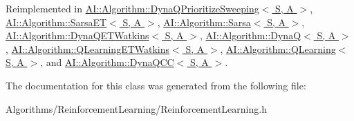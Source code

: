 Reimplemented in \hyperlink{classAI_1_1Algorithm_1_1DynaQPrioritizeSweeping_ad08b55f3cf927189dd31abf9fc1c2959}{A\-I\-::\-Algorithm\-::\-Dyna\-Q\-Prioritize\-Sweeping$<$ S, A $>$}, \hyperlink{classAI_1_1Algorithm_1_1SarsaET_adf13376b7ec8fdfa2b19ffadb1aa81e7}{A\-I\-::\-Algorithm\-::\-Sarsa\-E\-T$<$ S, A $>$}, \hyperlink{classAI_1_1Algorithm_1_1Sarsa_ae1d62478d3e31cace3fb594e05f83d1c}{A\-I\-::\-Algorithm\-::\-Sarsa$<$ S, A $>$}, \hyperlink{classAI_1_1Algorithm_1_1DynaQETWatkins_aa4e40af0fd705cd5d1f7fd13834c57c6}{A\-I\-::\-Algorithm\-::\-Dyna\-Q\-E\-T\-Watkins$<$ S, A $>$}, \hyperlink{classAI_1_1Algorithm_1_1DynaQ_a4542226b17db4ed8a2c5ec17d37dc42f}{A\-I\-::\-Algorithm\-::\-Dyna\-Q$<$ S, A $>$}, \hyperlink{classAI_1_1Algorithm_1_1QLearningETWatkins_a5cbad8c16dfbf6fe72c85fe5c8c4e273}{A\-I\-::\-Algorithm\-::\-Q\-Learning\-E\-T\-Watkins$<$ S, A $>$}, \hyperlink{classAI_1_1Algorithm_1_1QLearning_a042e1987ce21a94f59603c4cb1eeed82}{A\-I\-::\-Algorithm\-::\-Q\-Learning$<$ S, A $>$}, and \hyperlink{classAI_1_1Algorithm_1_1DynaQCC_ae23b8f0afbb9fc5024aef9ce720c9b84}{A\-I\-::\-Algorithm\-::\-Dyna\-Q\-C\-C$<$ S, A $>$}.



The documentation for this class was generated from the following file\-:\begin{DoxyCompactItemize}
\item 
Algorithms/\-Reinforcement\-Learning/Reinforcement\-Learning.\-h\end{DoxyCompactItemize}
